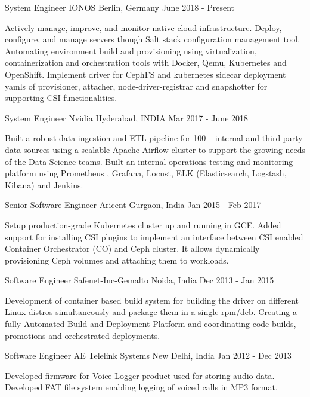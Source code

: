 
\begin{cventries}
  \cventry
    {System Engineer}
    {IONOS}
    {Berlin, Germany}
    {June 2018 - Present}
    {
      \begin{cvitems}
        \item {Actively manage, improve, and monitor native cloud infrastructure. Deploy, configure, and manage servers though Salt stack configuration management tool. Automating environment build and provisioning using virtualization, containerization and orchestration tools with Docker, Qemu, Kubernetes and OpenShift.  Implement driver for CephFS and kubernetes sidecar deployment yamls of provisioner, attacher, node-driver-registrar and snapshotter for supporting CSI functionalities. }
      \end{cvitems}
    }	

  \cventry
    {System Engineer}
    {Nvidia}
    {Hyderabad, INDIA}
    {Mar 2017 - June 2018 }
    {
      \begin{cvitems}
        \item {Built a robust data ingestion and ETL pipeline for 100+ internal and third party data sources using a scalable Apache Airflow cluster to support the growing needs of the Data Science teams. Built an internal operations testing and monitoring platform using Prometheus , Grafana, Locust, ELK (Elasticsearch, Logstash, Kibana) and Jenkins. }
      \end{cvitems}
    }	
    
  \cventry
    {Senior Software Engineer}
    {Aricent}
    {Gurgaon, India}
    {Jan 2015 - Feb 2017}
    {
      \begin{cvitems}
        \item {Setup production-grade Kubernetes cluster up and running in GCE. Added support for installing CSI plugins to implement an interface between CSI enabled Container Orchestrator (CO) and Ceph cluster. It allows dynamically provisioning Ceph volumes and attaching them to workloads. }
      \end{cvitems}
    }	  
	  
  \cventry
    {Software Engineer}
    {Safenet-Inc-Gemalto}
    {Noida, India}
    {Dec 2013 - Jan 2015}
    {
      \begin{cvitems}
        \item {Development of container based build system for building the driver on different Linux distros simultaneously and package them in a single rpm/deb. Creating a fully Automated Build and Deployment Platform and coordinating code builds, promotions and orchestrated deployments.}
      \end{cvitems}
    }	  
	  
  \cventry
    {Software Engineer}
    {AE Telelink Systems}
    {New Delhi, India}
    {Jan 2012 - Dec 2013}
    {
      \begin{cvitems}
        \item {Developed firmware for Voice Logger product used for storing audio data. Developed FAT file system enabling logging of voiced calls in MP3 format.}
      \end{cvitems}
    }  
\end{cventries}
